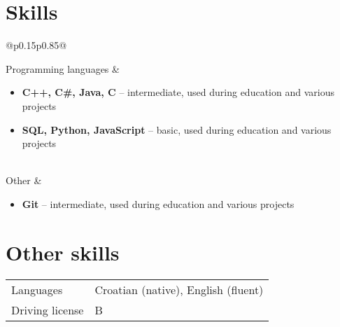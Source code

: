 \documentclass[a4paper]{article}
\makeatletter
\newlength{\tablewidth}
\newenvironment{skills}{%
\setlength{\tablewidth}{\linewidth}
\addtolength{\tablewidth}{-2\tabcolsep}
\begin{tabular}{@{}p{0.15\tablewidth}p{0.85\tablewidth}@{}}
}{%
\end{tabular}
}
\makeatother
\begin{document}
\section{Skills}
\begin{skills}
	Programming languages &
	\begin{itemize}
		\item \textbf{C++, C\#, Java, C} -- intermediate, used during education and various projects
		\item \textbf{SQL, Python, JavaScript} -- basic, used during education and various projects
	\end{itemize} \\
	Other &
	\begin{itemize}
		\item \textbf{Git} -- intermediate, used during education and various projects
	\end{itemize}
\end{skills}

\section{Other skills}
\begin{skills}
    Languages & Croatian (native), English (fluent) \\
    Driving license & B \\
\end{skills}
\end{document}
